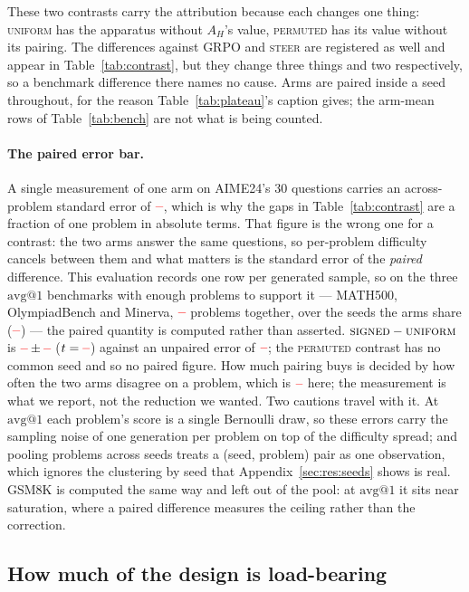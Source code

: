 \documentclass[11pt]{article}
\newcommand{\AH}{A_{H}}
\providecommand{\PENDING}{\textcolor{red}{\textbf{--}}}
\newcommand{\num}[1]{\ifcsname #1\endcsname\csname #1\endcsname\else\PENDING\fi}
\begin{document}
These two contrasts carry the attribution because each changes one thing:
\textsc{uniform} has the apparatus without $\AH$'s value, \textsc{permuted} has its
value without its pairing. The differences against GRPO and \textsc{steer} are
registered as well and appear in Table~\ref{tab:contrast}, but they change three
things and two respectively, so a benchmark difference there names no cause. Arms are
paired inside a seed throughout, for the reason Table~\ref{tab:plateau}'s caption
gives; the arm-mean rows of Table~\ref{tab:bench} are not what is being counted.

\paragraph{The paired error bar.} A single measurement of one arm on AIME24's $30$
questions carries an across-problem standard error of $\num{SEaime}$, which is why
the gaps in Table~\ref{tab:contrast} are a fraction of one problem in absolute terms.
That figure is the wrong one for a contrast: the two arms answer the same questions,
so per-problem difficulty cancels between them and what matters is the standard error
of the \emph{paired} difference. This evaluation records one row per generated
sample, so on the three $\mathrm{avg@}1$ benchmarks with enough problems to support
it --- MATH500, OlympiadBench and Minerva, $\num{Pairn}$ problems together, over the
seeds the arms share ($\num{Pairnseeds}$) --- the paired quantity is computed rather
than asserted. $\textsc{signed} - \textsc{uniform}$ is $\num{Pairsigneduniform} \pm
\num{Pairsigneduniformse}$ ($t = \num{Pairsigneduniformt}$) against an unpaired error
of $\num{Pairsigneduniformunpse}$; the \textsc{permuted} contrast has no common
seed and so no paired figure. How much pairing buys is decided by how often the two
arms disagree on a problem, which is $\num{Pairsigneduniformdisc}$ here; the
measurement is what we report, not the reduction we wanted. Two cautions travel with
it. At $\mathrm{avg@}1$ each problem's score is a single Bernoulli draw, so these
errors carry the sampling noise of one generation per problem on top of the
difficulty spread; and pooling problems across seeds treats a (seed, problem) pair as
one observation, which ignores the clustering by seed that
Appendix~\ref{sec:res:seeds} shows is real. GSM8K is computed the same way and left
out of the pool: at $\mathrm{avg@}1$ it sits near saturation, where a paired
difference measures the ceiling rather than the correction.

\subsection{How much of the design is load-bearing}
\label{sec:res:ablate}
\end{document}
